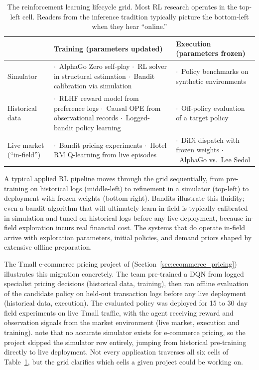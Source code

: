 \newcommand{\tabitem}{{\small$\cdot$}~}
\begin{table}[h]
\centering
\caption{The reinforcement learning lifecycle grid. Most RL research operates in the top-left cell. Readers from the inference tradition typically picture the bottom-left when they hear ``online.''}
\label{tab:lifecycle_grid}
\begin{tabular}{|p{2.8cm}|p{5.5cm}|p{5.5cm}|}
\hline
 & Training (parameters updated) & Execution (parameters frozen) \\
\hline
Simulator &
  \tabitem AlphaGo Zero self-play \newline
  \tabitem RL solver in structural estimation \newline
  \tabitem Bandit calibration via simulation &
  \tabitem Policy benchmarks on synthetic environments \\
\hline
Historical data &
  \tabitem RLHF reward model from preference logs \newline
  \tabitem Causal OPE from observational records \newline
  \tabitem Logged-bandit policy learning &
  \tabitem Off-policy evaluation of a target policy \\
\hline
Live market (``in-field'') &
  \tabitem Bandit pricing experiments \newline
  \tabitem Hotel RM Q-learning from live episodes &
  \tabitem DiDi dispatch with frozen weights \newline
  \tabitem AlphaGo vs.\ Lee Sedol \\
\hline
\end{tabular}
\end{table}

A typical applied RL pipeline moves through the grid sequentially, from pre-training on historical logs (middle-left) to refinement in a simulator (top-left) to deployment with frozen weights (bottom-right). Bandits illustrate this fluidity; even a bandit algorithm that will ultimately learn in-field is typically calibrated in simulation and tuned on historical logs before any live deployment, because in-field exploration incurs real financial cost. The systems that do operate in-field arrive with exploration parameters, initial policies, and demand priors shaped by extensive offline preparation.

The Tmall e-commerce pricing project of \citet{Liu2019} (Section~\ref{sec:ecommerce_pricing}) illustrates this migration concretely. The team pre-trained a DQN from logged specialist pricing decisions (historical data, training), then ran offline evaluation of the candidate policy on held-out transaction logs before any live deployment (historical data, execution). The evaluated policy was deployed for 15 to 30 day field experiments on live Tmall traffic, with the agent receiving reward and observation signals from the market environment (live market, execution and training). \citet{Liu2019} note that no accurate simulator exists for e-commerce pricing, so the project skipped the simulator row entirely, jumping from historical pre-training directly to live deployment. Not every application traverses all six cells of Table~\ref{tab:lifecycle_grid}, but the grid clarifies which cells a given project could be working on.

